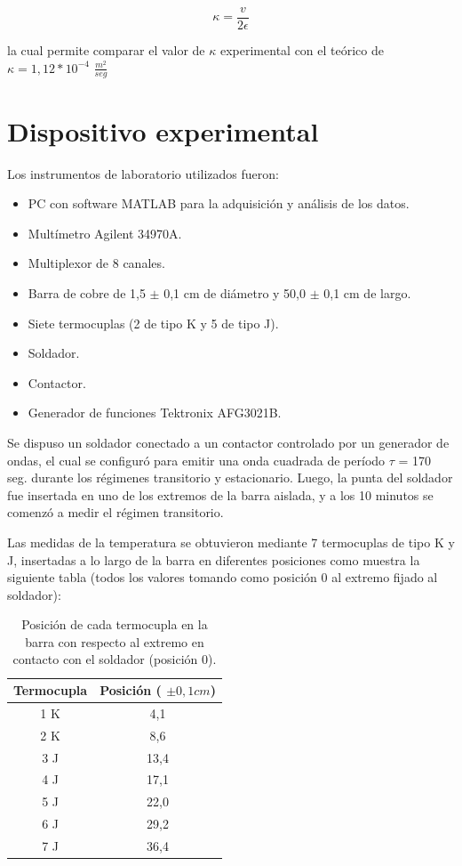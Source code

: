 \documentclass[twoside,twocolumn,a4paper]{article}
\begin{document}
\begin{equation}
\label{eq:kappa}
\kappa = \frac{v}{2\epsilon}
\end{equation}

la cual permite comparar el valor de $\kappa$ experimental con el te\'orico \cite{teo:kappa} de $\kappa = 1,12*10^{-4}$ $\frac{m^{2}}{seg}$


\section{Dispositivo experimental}

Los instrumentos de laboratorio utilizados fueron:
\begin{itemize}
\item 
\label{Laser} PC con software MATLAB para la adquisici\'on y an\'alisis de los datos.
\item Mult\'imetro Agilent 34970A.
\item Multiplexor de 8 canales.
\item Barra de cobre de 1,5 $\pm$ 0,1 cm de di\'ametro y 50,0 $\pm$ 0,1 cm de largo.
\item Siete termocuplas (2 de tipo K y 5 de tipo J).
\item Soldador.
\item Contactor.
\item Generador de funciones Tektronix AFG3021B.
\end{itemize}

Se dispuso un soldador conectado a un contactor controlado por un generador de ondas, el cual se configur\'o para emitir una onda cuadrada de per\'iodo $\tau$ = 170 seg. durante los r\'egimenes transitorio y estacionario. Luego, la punta del soldador fue insertada en uno de los extremos de la barra aislada, y a los 10 minutos se comenz\'o a medir el r\'egimen transitorio. \newline

\par
Las medidas de la temperatura se obtuvieron mediante 7 termocuplas de tipo K y J, insertadas a lo largo de la barra en diferentes posiciones como muestra la siguiente tabla (todos los valores tomando como posici\'on 0 al extremo fijado al soldador):

\begin{table}[H]
\centering
\caption{Posici\'on de cada termocupla en la barra con respecto al extremo en contacto con el soldador (posici\'on 0).}
\label{tab:posiciones}
\begin{tabular}{|c|c|}
\hline
Termocupla & Posici\'on ( $\pm 0,1 cm$) \\ \hline
1 K & 4,1\\ \hline
2 K & 8,6\\ \hline
3 J & 13,4\\ \hline
4 J & 17,1\\ \hline
5 J & 22,0\\ \hline
6 J & 29,2\\ \hline
7 J & 36,4\\ \hline
\end{tabular}
\end{table}
\end{document}
